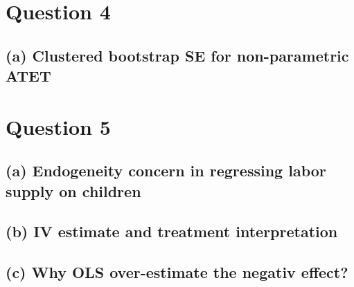 \documentclass{scrartcl}
\begin{document}

\section*{Question 4}

\subsection*{(a) Clustered bootstrap SE for non-parametric ATET}




\section*{Question 5}

\subsection*{(a) Endogeneity concern in regressing labor supply on children}


\subsection*{(b) IV estimate and treatment interpretation}


\subsection*{(c) Why OLS over-estimate the negativ effect?}

\end{document}
